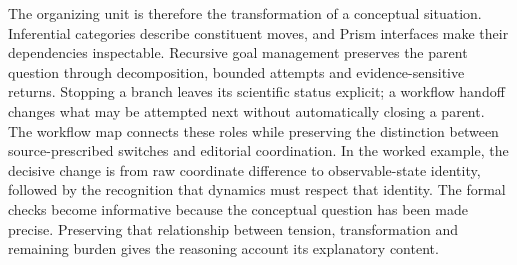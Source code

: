The organizing unit is therefore the transformation of a conceptual situation.
Inferential categories describe constituent moves, and Prism interfaces make
their dependencies inspectable. Recursive goal management preserves the parent
question through decomposition, bounded attempts and evidence-sensitive returns.
Stopping a branch leaves its scientific status explicit; a workflow handoff
changes what may be attempted next without automatically closing a parent.
The workflow map connects these roles while preserving the distinction between
source-prescribed switches and editorial coordination. In the worked example, the decisive change is
from raw coordinate difference to observable-state identity, followed by the
recognition that dynamics must respect that identity. The formal checks become
informative because the conceptual question has been made precise. Preserving
that relationship between tension, transformation and remaining burden gives the
reasoning account its explanatory content.
